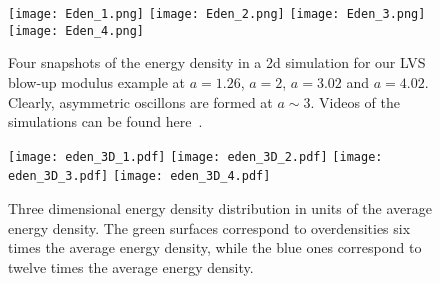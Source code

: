\documentclass[12pt]{article}
\begin{document}
\begin{figure}
\begin{center}
\texttt{[image: Eden\_1.png]}
\texttt{[image: Eden\_2.png]}
\texttt{[image: Eden\_3.png]}
\texttt{[image: Eden\_4.png]}
\end{center}
\caption{Four snapshots of the energy density in a 2d simulation for our LVS blow-up modulus example at $a=1.26$, $a=2$, $a=3.02$ and $a=4.02$. Clearly, asymmetric oscillons are formed at $a\sim3$. Videos of the simulations can be found here~\cite{movieslink}.}
\label{fig:energydensity}
\end{figure}

\begin{figure}
\begin{center}
\texttt{[image: eden\_3D\_1.pdf]}
\texttt{[image: eden\_3D\_2.pdf]}
\texttt{[image: eden\_3D\_3.pdf]}
\texttt{[image: eden\_3D\_4.pdf]}
\end{center}
\caption{Three dimensional energy density distribution in units of the average energy density. The green surfaces correspond to overdensities six times the average energy density, while the blue ones correspond to twelve times the average energy density.}
\label{fig:energydensity_3D}
\end{figure}
\end{document}
